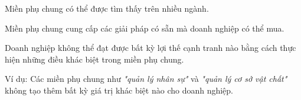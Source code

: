 Miền phụ chung có thể được tìm thấy trên nhiều ngành.

Miền phụ chung cung cấp các giải pháp có sẵn mà doanh nghiệp có thể mua.

Doanh nghiệp không thể đạt được bất kỳ lợi thế cạnh tranh nào bằng cách thực hiện những điều khác biệt trong miền phụ chung.

Ví dụ: Các miền phụ chung như    \textit{"quản lý nhân sự"}  và  \textit{"quản lý cơ sở vật chất"}           không tạo thêm bất kỳ giá trị khác biệt nào cho doanh nghiệp.
 


